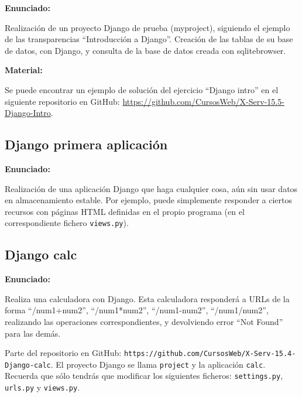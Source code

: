 \textbf{Enunciado:}

Realización de un proyecto Django de prueba (myproject), siguiendo el ejemplo de las transparencias ``Introducción a Django''. Creación de las tablas de su base de datos, con Django, y consulta de la base de datos creada con sqlitebrowser.

\textbf{Material:}

Se puede encontrar un ejemplo de solución del ejercicio ``Django intro'' en el siguiente repositorio en GitHub: \url{https://github.com/CursosWeb/X-Serv-15.5-Django-Intro}.

\subsection{Django primera aplicación}
\label{subsec:django-primera}

\textbf{Enunciado:}

Realización de una aplicación Django que haga cualquier cosa, aún sin usar datos en almacenamiento estable. Por ejemplo, puede simplemente responder a ciertos recursos con páginas HTML definidas en el propio programa (en el correspondiente fichero \texttt{views.py}).

\subsection{Django calc}
\label{subsec:django-calc}

\textbf{Enunciado:}

Realiza una calculadora con Django. Esta calculadora responderá a URLs de la forma ``/num1+num2'', ``/num1*num2'', ``/num1-num2'', ``/num1/num2'', realizando las operaciones correspondientes, y devolviendo error ``Not Found'' para las demás.

Parte del repositorio en GitHub: \verb|https://github.com/CursosWeb/X-Serv-15.4-Django-calc|. El proyecto Django se llama \texttt{project} y la aplicación \texttt{calc}. 
Recuerda que sólo tendrás que modificar los siguientes ficheros: \texttt{settings.py}, \texttt{urls.py} y \texttt{views.py}. 

%

